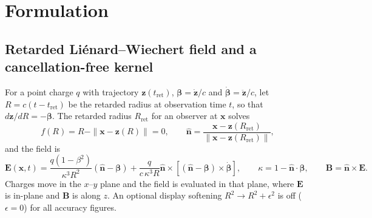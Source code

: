 \documentclass[11pt, a4paper]{article}
\begin{document}
\section{Formulation}

\subsection{Retarded Li\'enard--Wiechert field and a cancellation-free kernel}
For a point charge $q$ with trajectory $\mathbf{z}(t_{\text{ret}})$, $\boldsymbol{\beta} = \dot{\mathbf{z}}/c$ and $\dot{\boldsymbol{\beta}} = \ddot{\mathbf{z}}/c$, let $R = c(t - t_{\text{ret}})$ be the retarded radius at observation time $t$, so that $d\mathbf{z}/dR = -\boldsymbol{\beta}$. The retarded radius $R_{\text{ret}}$ for an observer at $\mathbf{x}$ solves
\begin{equation}
f(R) = R - \|\mathbf{x} - \mathbf{z}(R)\| = 0, \qquad \hat{\mathbf{n}} = \frac{\mathbf{x} - \mathbf{z}(R_{\text{ret}})}{\|\mathbf{x} - \mathbf{z}(R_{\text{ret}})\|},
\label{eq:rootfn}
\end{equation}
and the field is \cite{jackson1999}
\begin{equation}
\mathbf{E}(\mathbf{x}, t) = \frac{q(1 - \beta^2)}{\kappa^3 R^2}(\hat{\mathbf{n}} - \boldsymbol{\beta}) + \frac{q}{c\,\kappa^3 R}\hat{\mathbf{n}} \times \left[(\hat{\mathbf{n}} - \boldsymbol{\beta}) \times \dot{\boldsymbol{\beta}}\right], \qquad \kappa = 1 - \hat{\mathbf{n}}\cdot\boldsymbol{\beta}, \qquad \mathbf{B} = \hat{\mathbf{n}} \times \mathbf{E}.
\label{eq:lw}
\end{equation}
Charges move in the $x$--$y$ plane and the field is evaluated in that plane, where $\mathbf{E}$ is in-plane and $\mathbf{B}$ is along $z$. An optional display softening $R^2 \to R^2 + \epsilon^2$ is off ($\epsilon = 0$) for all accuracy figures.
\end{document}
